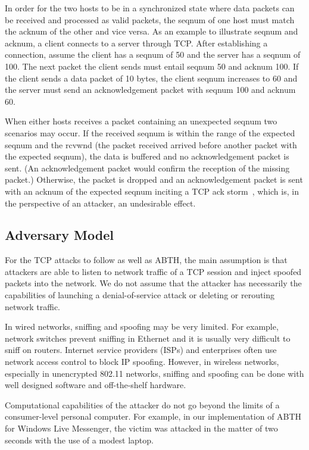 \documentclass{sig-alternate}
\begin{document}
In order for the two hosts to be in a synchronized state where data packets can be received and processed as valid packets, the seqnum of one host must match the acknum of the other and vice versa. 
As an example to illustrate seqnum and acknum, a client connects to a server through TCP.
After establishing a connection, assume the client has a seqnum of 50 and the server has a seqnum of 100.
The next packet the client sends must entail seqnum 50 and acknum 100.
If the client sends a data packet of 10 bytes, the client seqnum increases to 60 and the server must send an acknowledgement packet with seqnum 100 and acknum 60.

When either hosts receives a packet containing an unexpected seqnum two scenarios may occur.
If the received seqnum is within the range of the expected seqnum and the rcvwnd (the packet received arrived before another packet with the expected seqnum), the data is buffered and no acknowledgement packet is sent.
(An acknowledgement packet would confirm the reception of the missing packet.)
Otherwise, the packet is dropped and an acknowledgement packet is sent with an acknum of the expected seqnum inciting a TCP ack storm~\cite{anderson:ackstorm}, which is, in the perspective of an attacker, an undesirable effect.

\subsection{Adversary Model}
\label{sec:adversarymodel}

For the TCP attacks to follow as well as ABTH, the main assumption is that attackers are able to listen to network traffic of a TCP session and inject spoofed packets into the network.
We do not assume that the attacker has necessarily the capabilities of launching a denial-of-service attack or deleting or rerouting network traffic.

In wired networks, sniffing and spoofing may be very limited.
For example, network switches prevent sniffing in Ethernet and it is usually very difficult to sniff on routers.
Internet service providers (ISPs) and enterprises often use network access control to block IP spoofing.
However, in wireless networks, especially in unencrypted 802.11 networks, sniffing and spoofing can be done with well designed software and off-the-shelf hardware.

Computational capabilities of the attacker do not go beyond the limits of a consumer-level personal computer.
For example, in our implementation of ABTH for Windows Live Messenger, the victim was attacked in the matter of two seconds with the use of a modest laptop.
\end{document}
